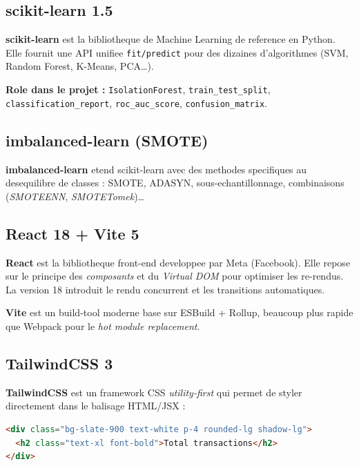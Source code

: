 \documentclass[12pt,a4paper,oneside]{report}
\begin{document}
\subsection{scikit-learn 1.5}

\textbf{scikit-learn} est la bibliotheque de Machine Learning de reference
en Python. Elle fournit une API unifiee \texttt{fit/predict} pour des
dizaines d'algorithmes (SVM, Random Forest, K-Means, PCA\dots).

\textbf{Role dans le projet :} \texttt{IsolationForest},
\texttt{train\_test\_split}, \texttt{classification\_report},
\texttt{roc\_auc\_score}, \texttt{confusion\_matrix}.

\subsection{imbalanced-learn (SMOTE)}

\textbf{imbalanced-learn} etend scikit-learn avec des methodes specifiques
au desequilibre de classes : SMOTE, ADASYN, sous-echantillonnage,
combinaisons (\emph{SMOTEENN}, \emph{SMOTETomek})\dots

\subsection{React 18 + Vite 5}

\textbf{React} est la bibliotheque front-end developpee par Meta (Facebook).
Elle repose sur le principe des \emph{composants} et du \emph{Virtual DOM}
pour optimiser les re-rendus. La version 18 introduit le rendu concurrent
et les transitions automatiques.

\textbf{Vite} est un build-tool moderne base sur ESBuild + Rollup, beaucoup
plus rapide que Webpack pour le \emph{hot module replacement}.

\subsection{TailwindCSS 3}

\textbf{TailwindCSS} est un framework CSS \emph{utility-first} qui permet
de styler directement dans le balisage HTML/JSX :

\begin{lstlisting}[language=html,caption={Exemple Tailwind},label=lst:tailwind]
<div class="bg-slate-900 text-white p-4 rounded-lg shadow-lg">
  <h2 class="text-xl font-bold">Total transactions</h2>
</div>
\end{lstlisting}
\end{document}
